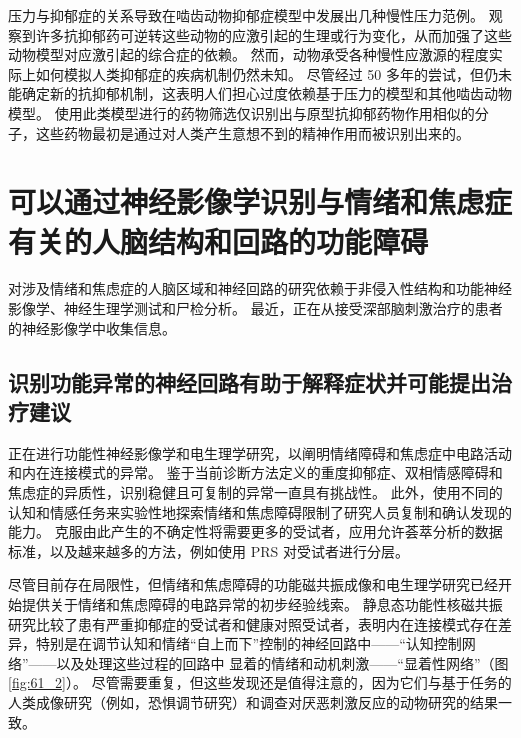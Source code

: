 压力与抑郁症的关系导致在啮齿动物抑郁症模型中发展出几种慢性压力范例。
观察到许多抗抑郁药可逆转这些动物的应激引起的生理或行为变化，从而加强了这些动物模型对应激引起的综合症的依赖。
然而，动物承受各种慢性应激源的程度实际上如何模拟人类抑郁症的疾病机制仍然未知。
尽管经过 50 多年的尝试，但仍未能确定新的抗抑郁机制，这表明人们担心过度依赖基于压力的模型和其他啮齿动物模型。
使用此类模型进行的药物筛选仅识别出与原型抗抑郁药物作用相似的分子，这些药物最初是通过对人类产生意想不到的精神作用而被识别出来的。



\section{可以通过神经影像学识别与情绪和焦虑症有关的人脑结构和回路的功能障碍}

对涉及情绪和焦虑症的人脑区域和神经回路的研究依赖于非侵入性结构和功能神经影像学、神经生理学测试和尸检分析。
最近，正在从接受深部脑刺激治疗的患者的神经影像学中收集信息。



\subsection{识别功能异常的神经回路有助于解释症状并可能提出治疗建议}

正在进行功能性神经影像学和电生理学研究，以阐明情绪障碍和焦虑症中电路活动和内在连接模式的异常。
鉴于当前诊断方法定义的重度抑郁症、双相情感障碍和焦虑症的异质性，识别稳健且可复制的异常一直具有挑战性。
此外，使用不同的认知和情感任务来实验性地探索情绪和焦虑障碍限制了研究人员复制和确认发现的能力。
克服由此产生的不确定性将需要更多的受试者，应用允许荟萃分析的数据标准，以及越来越多的方法，例如使用 PRS 对受试者进行分层。


尽管目前存在局限性，但情绪和焦虑障碍的功能磁共振成像和电生理学研究已经开始提供关于情绪和焦虑障碍的电路异常的初步经验线索。
静息态功能性核磁共振研究比较了患有严重抑郁症的受试者和健康对照受试者，表明内在连接模式存在差异，特别是在调节认知和情绪“自上而下”控制的神经回路中——“认知控制网络”——以及处理这些过程的回路中 显着的情绪和动机刺激——“显着性网络”（图 \ref{fig:61_2}）。
尽管需要重复，但这些发现还是值得注意的，因为它们与基于任务的人类成像研究（例如，恐惧调节研究）和调查对厌恶刺激反应的动物研究的结果一致。



